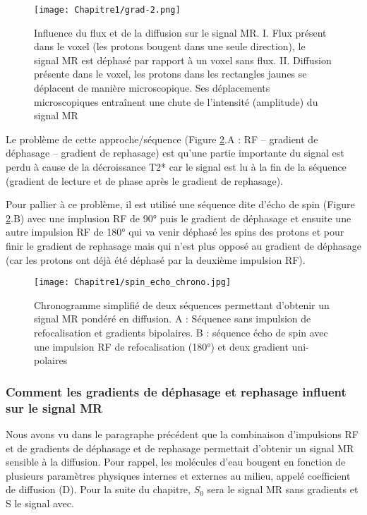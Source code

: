 \begin{figure}[!htbp]
  \begin{center}
    \texttt{[image: Chapitre1/grad-2.png]}
     \end{center}
    \caption{Influence du flux et de la diffusion sur le signal MR. I. Flux présent dans le voxel (les protons bougent dans une seule direction), le signal MR est déphasé par rapport à un voxel sans flux. II. Diffusion présente dans le voxel, les protons dans les rectangles jaunes se déplacent de manière microscopique. Ses déplacements microscopiques entraînent une chute de l’intensité (amplitude) du signal MR \cite{2014}}
  \label{fig:grad_2}
\end{figure}
\clearpage

Le problème de cette approche/séquence (Figure \ref{fig:grad_3}.A : RF – gradient de déphasage – gradient de rephasage) est qu’une partie importante du signal est perdu à cause de la décroissance T2* car le signal est lu à la fin de la séquence (gradient de lecture et de phase après le gradient de rephasage).

Pour pallier à ce problème, il est utilisé une séquence dite d’écho de spin (Figure \ref{fig:grad_3}.B) avec une implusion RF de 90° puis le gradient de déphasage et ensuite une autre impulsion RF de 180° qui va venir déphasé les spins des protons et pour finir le gradient de rephasage mais qui n’est plus opposé au gradient de déphasage (car les protons ont déjà été déphasé par la deuxième impulsion RF).

\begin{figure}[!htbp]
  \begin{center}
    \texttt{[image: Chapitre1/spin\_echo\_chrono.jpg]}
     \end{center}
    \caption{Chronogramme simplifié de deux séquences permettant d’obtenir un signal MR pondéré en diffusion. A : Séquence sans impulsion de refocalisation et gradients bipolaires. B : séquence écho de spin avec une impulsion RF de refocalisation (180°) et deux gradient uni-polaires}
  \label{fig:grad_3}
\end{figure}
\clearpage
\subsubsection{Comment les gradients de déphasage et rephasage influent sur le signal MR}


Nous avons vu dans le paragraphe précédent que la combinaison d’impulsions RF et de gradients de déphasage et de rephasage permettait d’obtenir un signal MR sensible à la diffusion. Pour rappel, les molécules d’eau bougent en fonction de plusieurs paramètres physiques internes et externes au milieu, appelé coefficient de diffusion (D). Pour la suite du chapitre, $S_0$ sera le signal MR sans gradients et S le signal avec.


